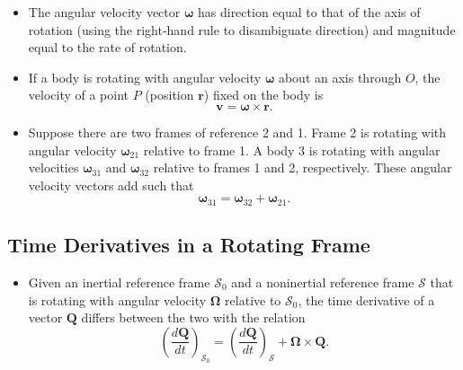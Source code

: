\documentclass{article}
\renewcommand{\vec}[1]{\boldsymbol{\mathbf{#1}}}
\begin{document}
\begin{itemize}
  \item The angular velocity vector $\vec{\omega}$ has direction equal to that of the axis of rotation (using the right-hand rule to disambiguate direction) and magnitude equal to the rate of rotation.

  \item If a body is rotating with angular velocity $\vec{\omega}$ about an axis through $O$, the velocity of a point $P$ (position $\vec{r}$) fixed on the body is \[\vec{v} = \vec{\omega} \times \vec{r}.\]

  \item Suppose there are two frames of reference 2 and 1. Frame 2 is rotating with angular velocity $\vec{\omega}_{21}$ relative to frame 1. A body 3 is rotating with angular velocities $\vec{\omega}_{31}$ and $\vec{\omega}_{32}$ relative to frames 1 and 2, respectively. These angular velocity vectors add such that \[\vec{\omega}_{31} = \vec{\omega}_{32} + \vec{\omega}_{21}.\]
\end{itemize}

\subsection{Time Derivatives in a Rotating Frame}

\begin{itemize}
  \item Given an inertial reference frame $\mathcal{S}_0$ and a noninertial reference frame $\mathcal{S}$ that is rotating with angular velocity $\vec{\Omega}$ relative to $\mathcal{S}_0$, the time derivative of a vector $\vec{Q}$ differs between the two with the relation \[\left( \frac{d \vec{Q}}{d t} \right)_{\mathcal{S}_0} = \left( \frac{d \vec{Q}}{d t} \right)_\mathcal{S} + \vec{\Omega} \times \vec{Q}.\]
\end{itemize}
\end{document}
